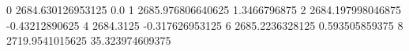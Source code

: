 0 2684.630126953125 0.0
1 2685.976806640625 1.3466796875
2 2684.197998046875 -0.43212890625
4 2684.3125 -0.317626953125
6 2685.2236328125 0.593505859375
8 2719.9541015625 35.323974609375
